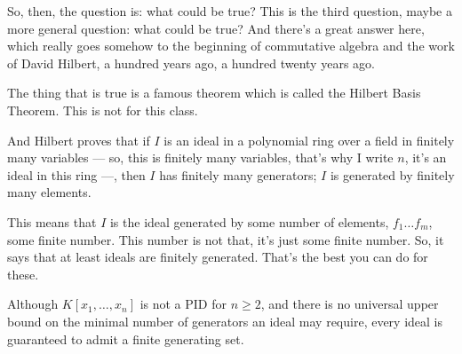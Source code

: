 \begin{speech}[00:02:03 - 00:03:30]
So, then, the question is: what could be true?  This is the third question,  maybe a more general question: what could be true? And there's a great answer here, which really goes somehow to the beginning of commutative algebra and the work of David Hilbert, a hundred years ago,  a hundred twenty years ago.

The thing that is true is a famous theorem which is called the Hilbert Basis Theorem.  This is not for this class. 

And Hilbert proves that if  $I$ is an ideal in a polynomial ring over a field in finitely many variables ---  so, this is finitely many variables, that's why I write $n$, it's an ideal in this ring ---, then  $I$ has finitely many generators; $I$ is generated by finitely many elements. 

This means that $I$  is the ideal generated by some number of elements, $f_1 \dots f_m$, some finite number. This number is not that, it's just some finite number. So, it says that at least ideals are finitely generated. That's the best you can do for these.
\end{speech}

\begin{content}

\begin{steps}
Although $K[x_1, \dots, x_n]$ is not a PID for $n \ge 2$, and there is no universal upper bound on the minimal number of generators an ideal may require, every ideal is guaranteed to admit a finite generating set.
\end{steps}
\end{content}

